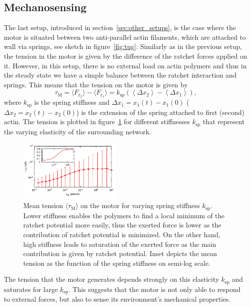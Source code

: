 \documentclass[aps,pre,twocolumn,showpacs,showkeys,superscriptaddress,floatfix]{revtex4-1}
\begin{document}
\subsection{Mechanosensing}
\label{sec:mechanosensing}
The last setup, introduced in section~\ref{sec:other_setups}, is the case where the motor is situated between two anti-parallel actin filaments, which are attached to wall via springs, see sketch in figure~\ref{fig:tug}. 
Similarly as in the previous setup, the tension in the motor is given by the difference of the ratchet forces applied on it.
However, in this setup, there is no external load on actin polymers and thus in the steady state we have a simple balance between the ratchet interaction and springs. 
This means that the tension on the motor is given by
\[
\tau_\text{M} 
= \langle F_{\text{r}_2}\rangle - \langle F_{\text{r}_1} \rangle 
= k_\text{sp} \left( \left\langle \Delta x_2 \right\rangle - \left\langle \Delta x_1 \right\rangle \right) ,
\]
where $k_\text{sp}$ is the spring stiffness and $\Delta x_1 = x_1(t) - x_1(0)$ ($\Delta x_2 = x_2(t) - x_2(0)$) is the extension of the spring attached to first (second) actin. 
The tension is plotted in figure~\ref{fig:tug_k} for different stiffnesses $k_\text{sp}$ that represent the varying elasticity of the surrounding network.
\begin{figure}[t]
\centering
\includegraphics[width=0.45\textwidth,height=!]{tug_k}
\caption{
\label{fig:tug_k}
Mean tension $\langle \tau_\text{M} \rangle$ on the motor for varying spring stiffness $k_\text{sp}$.
Lower stiffness enables the polymers to find a local minimum of the ratchet potential more easily, 
thus the exerted force is lower as the contribution of ratchet potential is minimized. 
On the other hand, high stiffness leads to saturation of the exerted force as the main contribution is given by ratchet potential. 
Inset depicts the mean tension as the function of the spring stiffness on semi-log scale. 
}
\end{figure}
The tension that the motor generates depends strongly on this elasticity $k_\text{sp}$ and saturates for large $k_\text{sp}$. 
This suggests that the motor is not only able to respond to external forces, but also to sense its environment's mechanical properties.
\end{document}
